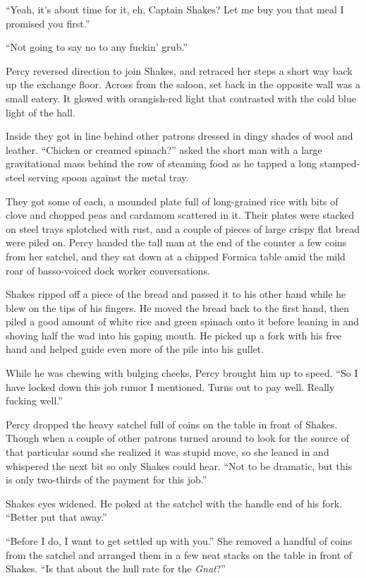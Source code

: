 \documentclass[
]{scrbook}
\begin{document}
``Yeah, it's about time for it, eh, Captain Shakes? Let me buy you that
meal I promised you first.''

``Not going to say no to any fuckin' grub.''

Percy reversed direction to join Shakes, and retraced her steps a short
way back up the exchange floor. Across from the saloon, set back in the
opposite wall was a small eatery. It glowed with orangish-red light that
contrasted with the cold blue light of the hall.

Inside they got in line behind other patrons dressed in dingy shades of
wool and leather. ``Chicken or creamed spinach?'' asked the short man
with a large gravitational mass behind the row of steaming food as he
tapped a long stamped-steel serving spoon against the metal tray.

They got some of each, a mounded plate full of long-grained rice with
bits of clove and chopped peas and cardamom scattered in it. Their
plates were stacked on steel trays splotched with rust, and a couple of
pieces of large crispy flat bread were piled on. Percy handed the tall
man at the end of the counter a few coins from her satchel, and they sat
down at a chipped Formica table amid the mild roar of basso-voiced dock
worker conversations.

Shakes ripped off a piece of the bread and passed it to his other hand
while he blew on the tips of his fingers. He moved the bread back to the
first hand, then piled a good amount of white rice and green spinach
onto it before leaning in and shoving half the wad into his gaping
mouth. He picked up a fork with his free hand and helped guide even more
of the pile into his gullet.

While he was chewing with bulging cheeks, Percy brought him up to speed.
``So I have locked down this job rumor I mentioned. Turns out to pay
well. Really fucking well.''

Percy dropped the heavy satchel full of coins on the table in front of
Shakes. Though when a couple of other patrons turned around to look for
the source of that particular sound she realized it was stupid move, so
she leaned in and whispered the next bit so only Shakes could hear.
``Not to be dramatic, but this is only two-thirds of the payment for
this job.''

Shakes eyes widened. He poked at the satchel with the handle end of his
fork. ``Better put that away.''

``Before I do, I want to get settled up with you.'' She removed a
handful of coins from the satchel and arranged them in a few neat stacks
on the table in front of Shakes. ``Is that about the hull rate for the
\emph{Gnat}?''
\end{document}
